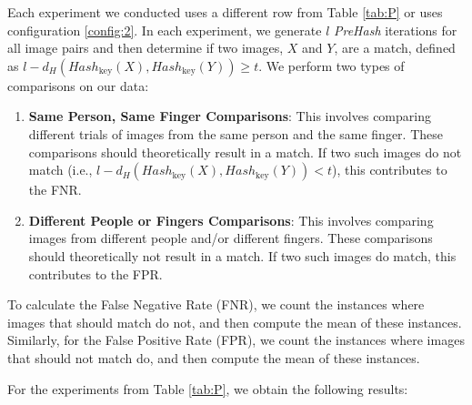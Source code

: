 Each experiment we conducted uses a different row from Table \ref{tab:P} or uses configuration \ref{config:2}. In each experiment, we generate \( l \) \textit{PreHash} iterations for all image pairs and then determine if two images, \(X\) and \(Y\), are a match, defined as \( l - d_H(Hash_{\text{key}}(X), Hash_{\text{key}}(Y)) \geq t \). We perform two types of comparisons on our data:

\begin{enumerate}
    \item \textbf{Same Person, Same Finger Comparisons}: This involves comparing different trials of images from the same person and the same finger. These comparisons should theoretically result in a match. If two such images do not match (i.e., \( l - d_H(Hash_{\text{key}}(X), Hash_{\text{key}}(Y)) < t \)), this contributes to the FNR.
    \item \textbf{Different People or Fingers Comparisons}: This involves comparing images from different people and/or different fingers. These comparisons should theoretically not result in a match. If two such images do match, this contributes to the FPR.
\end{enumerate}

To calculate the False Negative Rate (FNR), we count the instances where images that should match do not, and then compute the mean of these instances. Similarly, for the False Positive Rate (FPR), we count the instances where images that should not match do, and then compute the mean of these instances.

For the experiments from Table \ref{tab:P}, we obtain the following results:


